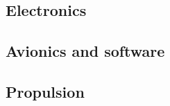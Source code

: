 \documentclass[../../main.tex]{subfiles}
\begin{document}
\subsection{Electronics} \label{sec:design-process:final-design-proposal:electronics}


\subsection{Avionics and software} \label{sec:design-process:final-design-proposal:avionics-and-software}


\subsection{Propulsion} \label{sec:design-process:final-design-proposal:propulsion}
\end{document}
